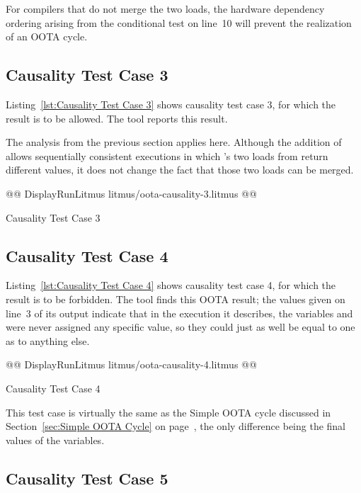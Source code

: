 \documentclass[10]{article}
\begin{document}
For compilers that do not merge the two loads, the hardware
dependency ordering arising from the conditional test on line~10
will prevent the realization of an OOTA cycle.

\subsection{Causality Test Case 3}
\label{app:Causality Test Case 3}

Listing~\ref{lst:Causality Test Case 3}
shows causality test case 3, for which the  result
is to be allowed.
The  tool reports this result.

The analysis from the previous section applies here.
Although the addition of  allows sequentially consistent executions
in which 's two loads from  return different values,
it does not change the fact that those two loads can be merged.

\begin{listing}[tbp]
@@ DisplayRunLitmus litmus/oota-causality-3.litmus @@
\caption{Causality Test Case 3}
\label{lst:Causality Test Case 3}
\end{listing}

\subsection{Causality Test Case 4}
\label{app:Causality Test Case 4}

Listing~\ref{lst:Causality Test Case 4}
shows causality test case 4, for which the  result
is to be forbidden.
The  tool finds this OOTA result;
the  values given on line~3 of its output indicate
that in the execution it describes, the variables  and~ were never
assigned any specific value, so they could just as well be equal to
one as to anything else.

\begin{listing}[tbp]
@@ DisplayRunLitmus litmus/oota-causality-4.litmus @@
\caption{Causality Test Case 4}
\label{lst:Causality Test Case 4}
\end{listing}

This test case is virtually the same as the Simple OOTA cycle
discussed in
Section~\ref{sec:Simple OOTA Cycle}
on
page~\pageref{sec:Simple OOTA Cycle},
the only difference being the final values of the variables.

\subsection{Causality Test Case 5}
\label{app:Causality Test Case 5}
\end{document}
